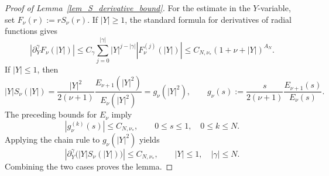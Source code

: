 \documentclass[12pt]{amsart}
\newtheorem{lemma}[theorem]{Lemma}
\begin{document}
\begin{proof}[Proof of Lemma~\ref{lem_S_derivative_bound}]
For the estimate in the $Y$-variable, set $F_\nu(r):=rS_\nu(r)$. If $|Y|\geq1$, the standard formula for derivatives of radial functions gives
\begin{equation*}
    \left|\partial_Y^\gamma F_\nu(|Y|)\right|
    \leq
    C_\gamma
    \sum_{j=0}^{|\gamma|}
    |Y|^{j-|\gamma|}
    \left|F_\nu^{(j)}(|Y|)\right|
    \leq
    C_{N,\nu_*}(1+\nu+|Y|)^{A_N}.
\end{equation*}
If $|Y|\leq1$, then
\begin{equation*}
    |Y|S_\nu(|Y|)
    =
    \frac{|Y|^2}{2(\nu+1)}
    \frac{E_{\nu+1}(|Y|^2)}{E_\nu(|Y|^2)}
    =
    g_\nu(|Y|^2), \qquad g_\nu(s)
    :=
    \frac{s}{2(\nu+1)}
    \frac{E_{\nu+1}(s)}{E_\nu(s)}.
\end{equation*}
The preceding bounds for $E_\nu$ imply
\begin{equation*}
    |g_\nu^{(k)}(s)|
    \leq
    C_{N,\nu_*},
    \qquad
    0\leq s\leq1,\quad 0\leq k\leq N.
\end{equation*}
Applying the chain rule to $g_\nu(|Y|^2)$ yields
\begin{equation*}
    \left|
        \partial_Y^\gamma\bigl(|Y|S_\nu(|Y|)\bigr)
    \right|
    \leq
    C_{N,\nu_*},
    \qquad
    |Y|\leq1,\quad |\gamma|\leq N.
\end{equation*}
Combining the two cases proves the lemma.
\end{proof}







\end{document}
